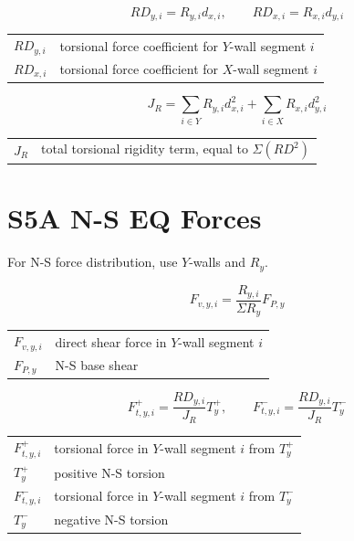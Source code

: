 \documentclass[10pt]{article}
\begin{document}
\begin{equation}
RD_{y,i}=R_{y,i}d_{x,i}, \qquad
RD_{x,i}=R_{x,i}d_{y,i}
\end{equation}

{\ttfamily\footnotesize
\begin{tabular}{@{}ll@{}}
$RD_{y,i}$ & torsional force coefficient for $Y$-wall segment $i$ \\
$RD_{x,i}$ & torsional force coefficient for $X$-wall segment $i$ \\
\end{tabular}
}

\begin{equation}
J_R =
\sum_{i\in Y} R_{y,i} d_{x,i}^2
+ \sum_{i\in X} R_{x,i} d_{y,i}^2
\end{equation}

{\ttfamily\footnotesize
\begin{tabular}{@{}ll@{}}
$J_R$ & total torsional rigidity term, equal to $\Sigma(RD^2)$ \\
\end{tabular}
}

\section{S5A N-S EQ Forces}

For N-S force distribution, use $Y$-walls and $R_y$.

\begin{equation}
F_{v,y,i}=\frac{R_{y,i}}{\Sigma R_y}F_{P,y}
\end{equation}

{\ttfamily\footnotesize
\begin{tabular}{@{}ll@{}}
$F_{v,y,i}$ & direct shear force in $Y$-wall segment $i$ \\
$F_{P,y}$ & N-S base shear \\
\end{tabular}
}

\begin{equation}
F_{t,y,i}^{+}=\frac{RD_{y,i}}{J_R}T_y^+, \qquad
F_{t,y,i}^{-}=\frac{RD_{y,i}}{J_R}T_y^-
\end{equation}

{\ttfamily\footnotesize
\begin{tabular}{@{}ll@{}}
$F_{t,y,i}^{+}$ & torsional force in $Y$-wall segment $i$ from $T_y^+$ \\
$T_y^+$ & positive N-S torsion \\
$F_{t,y,i}^{-}$ & torsional force in $Y$-wall segment $i$ from $T_y^-$ \\
$T_y^-$ & negative N-S torsion \\
\end{tabular}
}
\end{document}
